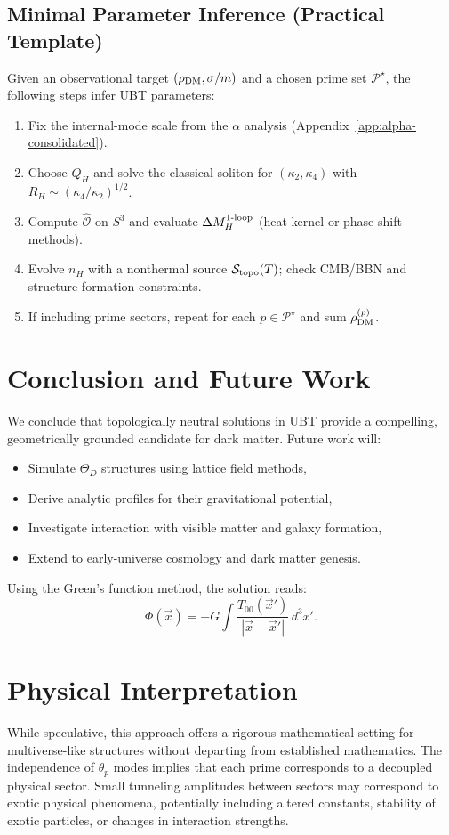 \documentclass[12pt,a4paper]{article}
\numberwithin{equation}{section}
\theoremstyle{definition}
\theoremstyle{remark}
\begin{document}
\subsection{Minimal Parameter Inference (Practical Template)}
Given an observational target $(\rho_{\rm DM}, \sigma/m)$ and a chosen prime set $\mathcal{P}^\star$, the following steps infer UBT parameters:
\begin{enumerate}
\item Fix the internal-mode scale from the $\alpha$ analysis (Appendix~\ref{app:alpha-consolidated}).
\item Choose $Q_H$ and solve the classical soliton for $(\kappa_2,\kappa_4)$ with $R_H\!\sim\!(\kappa_4/\kappa_2)^{1/2}$.
\item Compute $\hat{\mathcal{O}}$ on $S^3$ and evaluate $\Delta M_H^{\rm 1\text{-}loop}$ (heat-kernel or phase-shift methods).
\item Evolve $n_H$ with a nonthermal source $\mathcal{S}_{\rm topo}(T)$; check CMB/BBN and structure-formation constraints.
\item If including prime sectors, repeat for each $p\in\mathcal{P}^\star$ and sum $\rho_{\rm DM}^{(p)}$.
\end{enumerate}

\section{Conclusion and Future Work}
We conclude that topologically neutral solutions in UBT provide a compelling, geometrically grounded candidate for dark matter. Future work will:
\begin{itemize}
  \item Simulate \( \Theta_D \) structures using lattice field methods,
  \item Derive analytic profiles for their gravitational potential,
  \item Investigate interaction with visible matter and galaxy formation,
  \item Extend to early-universe cosmology and dark matter genesis.
\end{itemize}

Using the Green's function method, the solution reads:
\[
\Phi(\vec{x}) = -G \int \frac{T_{00}(\vec{x}')}{|\vec{x} - \vec{x}'|} \, d^3x'.
\]

\section{Physical Interpretation}
While speculative, this approach offers a rigorous mathematical setting for multiverse-like structures without departing from established mathematics. The independence of $\theta_p$ modes implies that each prime corresponds to a decoupled physical sector. Small tunneling amplitudes between sectors may correspond to exotic physical phenomena, potentially including altered constants, stability of exotic particles, or changes in interaction strengths.
\end{document}
